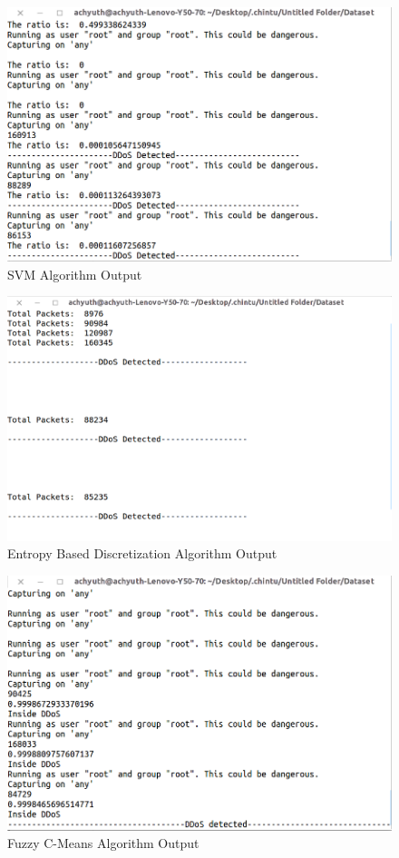 \documentclass[12pt,a4paper,final]{report}
\begin{document}
\begin{figure}[h]
\centering
\includegraphics[scale=0.4]{SVMOutput.png}
\caption{SVM Algorithm Output}
\end{figure}


\begin{figure}
\centering
\includegraphics[scale=0.4]{EBDOutput.png}
\caption{Entropy Based Discretization Algorithm Output}
\end{figure}


\begin{figure}
\centering
\includegraphics[scale=0.4]{FuzzyOutput.png}
\caption{Fuzzy C-Means Algorithm Output}
\end{figure}
\end{document}
